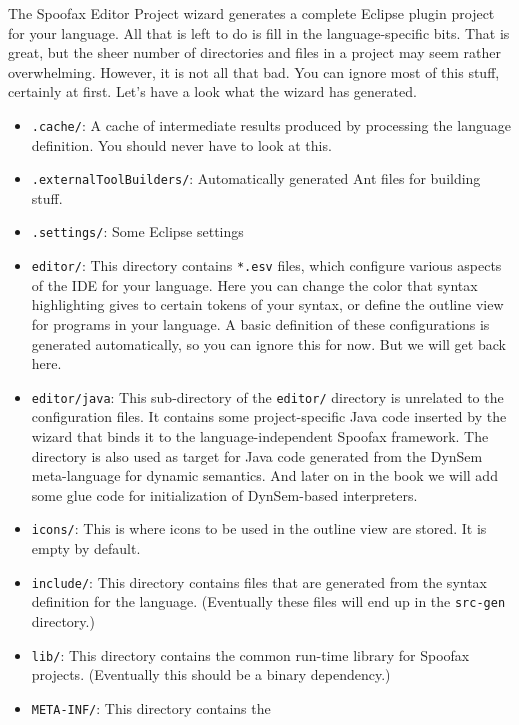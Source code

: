 The Spoofax Editor Project wizard generates a complete Eclipse plugin project
for your language. All that is left to do is fill in the language-specific bits.
That is great, but the sheer number of directories and files in a project may
seem rather overwhelming. However, it is not all that bad. You can ignore most
of this stuff, certainly at first. Let's have a look what the wizard has
generated.

\begin{itemize}

  \item \texttt{.cache/}: A cache of intermediate results produced by processing
  the language definition. You should never have to look at this.
  \item \texttt{.externalToolBuilders/}: Automatically generated Ant files for
  building stuff.
  \item \texttt{.settings/}: Some Eclipse settings \item \texttt{editor/}: This
  directory contains \texttt{*.esv} files, which configure various aspects of
  the IDE for your language. Here you can change the color that syntax
  highlighting gives to certain tokens of your syntax, or define the outline
  view for programs in your language. A basic definition of these configurations
  is generated automatically, so you can ignore this for now. But we will get
  back here.
  \item \texttt{editor/java}: This sub-directory of the \texttt{editor/}
  directory is unrelated to the configuration files. It contains some
  project-specific Java code inserted by the wizard that binds it to the
  language-independent Spoofax framework. The directory is also used as target
  for Java code generated from the DynSem meta-language for dynamic semantics.
  And later on in the book we will add some glue code for initialization of
  DynSem-based interpreters.
  \item \texttt{icons/}: This is where icons to be used in the outline view are
  stored. It is empty by default.
  \item \texttt{include/}: This directory contains files that are generated from
  the syntax definition for the language. (Eventually these files will end up in
  the \texttt{src-gen} directory.) 
  \item \texttt{lib/}: This directory contains the common run-time library for
  Spoofax projects. (Eventually this should be a binary dependency.) 
  \item \texttt{META-INF/}: This directory contains the

\end{itemize}
